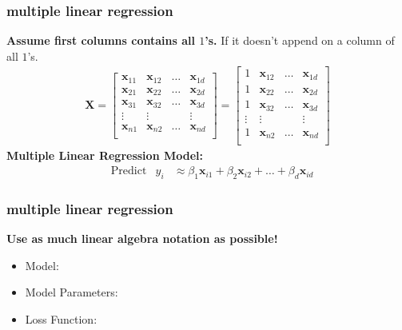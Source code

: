 \documentclass[handout,compress]{beamer}
\newcommand{\bv}[1]{\mathbf{#1}}
\begin{document}
\begin{frame}
	\frametitle{multiple linear regression}
	\textbf{Assume first columns contains all $1$'s.} If it doesn't append on a column of all $1$'s.
	\begin{align*}
	\bv{X} = \begin{bmatrix}
	\bv{x}_{11} & \bv{x}_{12}  & \ldots &\bv{x}_{1d}\\
	\bv{x}_{21} & \bv{x}_{22}  & \ldots &\bv{x}_{2d}\\
	\bv{x}_{31} & \bv{x}_{32}  & \ldots &\bv{x}_{3d}\\
	\vdots & \vdots  &  &\vdots\\
	\bv{x}_{n1} & \bv{x}_{n2}  & \ldots &\bv{x}_{nd}\\ 
	\end{bmatrix} = \begin{bmatrix}
	1 & \bv{x}_{12}  & \ldots &\bv{x}_{1d}\\
	1 & \bv{x}_{22}  & \ldots &\bv{x}_{2d}\\
	1 & \bv{x}_{32}  & \ldots &\bv{x}_{3d}\\
	\vdots & \vdots  &  &\vdots\\
	1 & \bv{x}_{n2}  & \ldots &\bv{x}_{nd}\\ 
	\end{bmatrix}
	\end{align*}
	\vspace{1em}
	\textbf{Multiple Linear Regression Model:}
	\begin{align*}
	&\text{Predict} & y_i &\approx \beta_1 \bv{x}_{i1} + \beta_2 \bv{x}_{i2} + \ldots + \beta_d \bv{x}_{id}
	\end{align*}
\end{frame}


\begin{frame}
	\frametitle{multiple linear regression}
			\begin{center}
				\textbf{Use as much linear algebra notation as possible!}
			\end{center}

			\begin{itemize}
				\item Model: 
				\vspace{4em}
				\item Model Parameters: 
				\vspace{4em}
				\item Loss Function:
				\vspace{4em}
			\end{itemize}
\end{frame}
\end{document}
